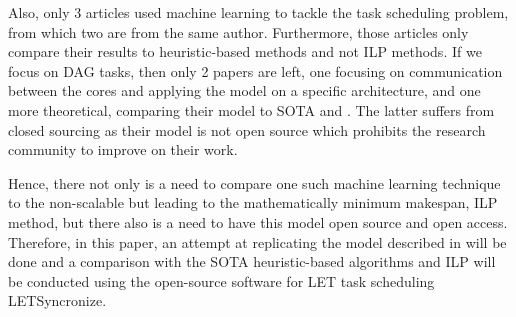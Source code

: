 Also, only 3 articles used machine learning to tackle the task scheduling problem,
from which two are from the same author.
Furthermore, those articles only compare their results to 
heuristic-based methods and not ILP methods.
If we focus on DAG tasks, then only 2 papers are left,
one focusing on communication between the cores and
applying the model on a specific architecture\cite{yano2021work},
and one more theoretical\cite{lee2021DAGDeeplearning}, comparing their model to SOTA 
\cite{zhao2020dag} and \cite{he2019intra}. The latter suffers 
from closed sourcing as their model is not open source
which prohibits the research community to improve on their work. 

Hence, there not only is a need to compare one such machine learning technique 
to the non-scalable but leading to the mathematically minimum makespan, ILP method,
but there also is a need to have this model open source and open access.
Therefore, in this paper, an attempt at replicating the model described
in \cite{lee2021DAGDeeplearning} will be done and 
a comparison with the SOTA heuristic-based algorithms
and ILP will be conducted using the open-source software 
for LET task scheduling LETSyncronize\cite{yip2023letsynchronise}.
